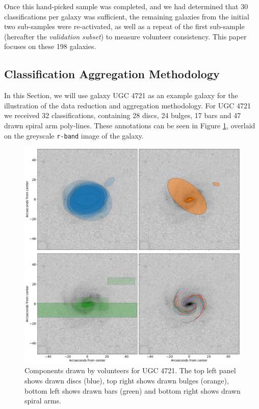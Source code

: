 \documentclass[../main.tex]{subfiles}
\begin{document}
Once this hand-picked sample was completed, and we had determined that 30 classifications per galaxy was sufficient, the remaining galaxies from the initial two sub-samples were re-activated, as well as a repeat of the first sub-sample (hereafter the \textit{validation subset}) to measure volunteer consistency. This paper focuses on these 198 galaxies.



\subsection{Classification Aggregation Methodology}

In this Section, we will use galaxy UGC 4721 as an example galaxy for the illustration of the data reduction and aggregation methodology. For UGC 4721 we received 32 classifications, containing 28 discs, 24 bulges, 17 bars and 47 drawn spiral arm poly-lines. These annotations can be seen in Figure \ref{fig:drawn_shapes}, overlaid on the greyscale \texttt{r-band} image of the galaxy.

\begin{figure}
  \includegraphics[width=17.3cm]{images__method/drawn_shapes.pdf}
  \caption{Components drawn by volunteers for UGC 4721. The top left panel shows drawn discs (blue), top right shows drawn bulges (orange), bottom left shows drawn bars (green) and bottom right shows drawn spiral arms.}
  \label{fig:drawn_shapes}
\end{figure}
\end{document}
